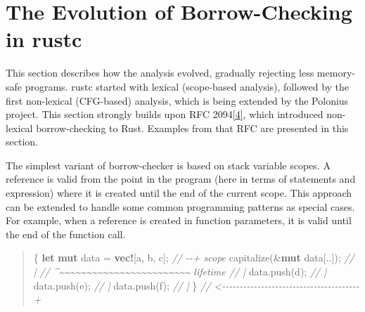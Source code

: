 \documentclass[
  11pt,
  twoside,symmetric]{report}
\newenvironment{Shaded}{}{}
\newcommand{\CharTok}[1]{#1}
\newcommand{\CommentTok}[1]{\textit{#1}}
\newcommand{\KeywordTok}[1]{\textbf{#1}}
\newcommand{\NormalTok}[1]{#1}
\newcommand{\OperatorTok}[1]{#1}
\newcommand{\PreprocessorTok}[1]{\textbf{#1}}
\begin{document}
\hypertarget{the-evolution-of-borrow-checking-in-rustc}{%
\section{The Evolution of Borrow-Checking in
rustc}\label{the-evolution-of-borrow-checking-in-rustc}}

This section describes how the analysis evolved, gradually rejecting
less memory-safe programs. rustc started with lexical (scope-based
analysis), followed by the first non-lexical (CFG-based) analysis, which
is being extended by the Polonius project. This section strongly builds
upon RFC 2094\protect\hyperlink{ref-rfc2094nll}{{[}4{]}}, which
introduced non-lexical borrow-checking to Rust. Examples from that RFC
are presented in this section.

The simplest variant of borrow-checker is based on stack variable
scopes. A reference is valid from the point in the program (here in
terms of statements and expression) where it is created until the end of
the current scope. This approach can be extended to handle some common
programming patterns as special cases. For example, when a reference is
created in function parameters, it is valid until the end of the
function call.

\begin{quote}
\begin{Shaded}
\begin{Highlighting}[]
\OperatorTok{\{}
    \KeywordTok{let} \KeywordTok{mut}\NormalTok{ data }\OperatorTok{=} \PreprocessorTok{vec!}\NormalTok{[}\CharTok{\textquotesingle{}a\textquotesingle{}}\OperatorTok{,} \CharTok{\textquotesingle{}b\textquotesingle{}}\OperatorTok{,} \CharTok{\textquotesingle{}c\textquotesingle{}}\NormalTok{]}\OperatorTok{;} \CommentTok{// {-}{-}+ \textquotesingle{}scope}
\NormalTok{    capitalize(}\OperatorTok{\&}\KeywordTok{mut}\NormalTok{ data[}\OperatorTok{..}\NormalTok{])}\OperatorTok{;}          \CommentTok{//   |}
 \CommentTok{// \^{}\textasciitilde{}\textasciitilde{}\textasciitilde{}\textasciitilde{}\textasciitilde{}\textasciitilde{}\textasciitilde{}\textasciitilde{}\textasciitilde{}\textasciitilde{}\textasciitilde{}\textasciitilde{}\textasciitilde{}\textasciitilde{}\textasciitilde{}\textasciitilde{}\textasciitilde{}\textasciitilde{}\textasciitilde{}\textasciitilde{}\textasciitilde{}\textasciitilde{}\textasciitilde{}\textasciitilde{} \textquotesingle{}lifetime //   |}
\NormalTok{    data}\OperatorTok{.}\NormalTok{push(}\CharTok{\textquotesingle{}d\textquotesingle{}}\NormalTok{)}\OperatorTok{;}                     \CommentTok{//   |}
\NormalTok{    data}\OperatorTok{.}\NormalTok{push(}\CharTok{\textquotesingle{}e\textquotesingle{}}\NormalTok{)}\OperatorTok{;}                     \CommentTok{//   |}
\NormalTok{    data}\OperatorTok{.}\NormalTok{push(}\CharTok{\textquotesingle{}f\textquotesingle{}}\NormalTok{)}\OperatorTok{;}                     \CommentTok{//   |}
\OperatorTok{\}} \CommentTok{// \textless{}{-}{-}{-}{-}{-}{-}{-}{-}{-}{-}{-}{-}{-}{-}{-}{-}{-}{-}{-}{-}{-}{-}{-}{-}{-}{-}{-}{-}{-}{-}{-}{-}{-}{-}{-}{-}{-}{-}{-}+}
\end{Highlighting}
\end{Shaded}
\end{quote}
\end{document}
